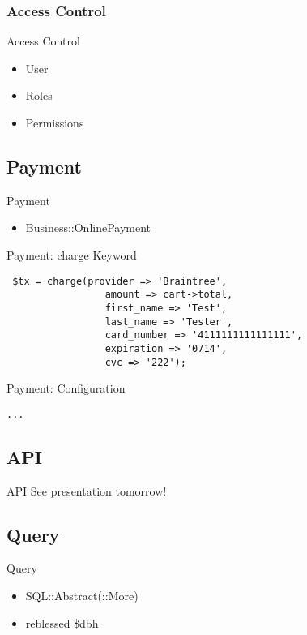 \subsubsection{Access Control}
\begin{frame}{Access Control}
\begin{itemize}
\item User
\item Roles
\item Permissions
\end{itemize}
\end{frame}

\subsection{Payment}

\begin{frame}{Payment}
\begin{itemize}
\item Business::OnlinePayment
\end{itemize}
\end{frame}

\begin{frame}[fragile]{Payment: charge Keyword}
\begin{lstlisting}
 $tx = charge(provider => 'Braintree',
                 amount => cart->total,
                 first_name => 'Test',
                 last_name => 'Tester',
                 card_number => '4111111111111111',
                 expiration => '0714',
                 cvc => '222');
\end{lstlisting}
\end{frame}

\begin{frame}[fragile]{Payment: Configuration}
\begin{lstlisting}
...
\end{lstlisting}
\end{frame}

\subsection{API}
\begin{frame}{API}
See presentation tomorrow!
\end{frame}

\subsection{Query}
\begin{frame}{Query}
\begin{itemize}
\item SQL::Abstract(::More)
\item reblessed \$dbh
\end{itemize}
\end{frame}

